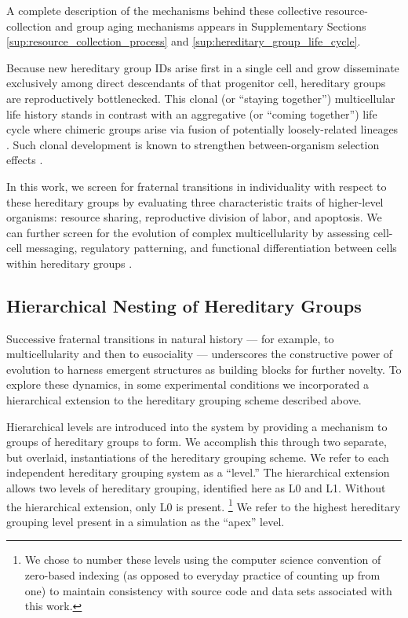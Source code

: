 A complete description of the mechanisms behind these collective resource-collection and group aging mechanisms appears in Supplementary Sections \ref{sup:resource_collection_process} and \ref{sup:hereditary_group_life_cycle}.

Because new hereditary group IDs arise first in a single cell and grow disseminate exclusively among direct descendants of that progenitor cell, hereditary groups are reproductively bottlenecked.
This clonal (or ``staying together'') multicellular life history stands in contrast with an aggregative (or ``coming together'') life cycle where chimeric groups arise via fusion of potentially loosely-related lineages \citep{staps2019emergence}.
Such clonal development is known to strengthen between-organism selection effects \citep{grosberg2007evolution}.

In this work, we screen for fraternal transitions in individuality with respect to these hereditary groups by evaluating three characteristic traits of higher-level organisms: resource sharing, reproductive division of labor, and apoptosis.
We can further screen for the evolution of complex multicellularity by assessing cell-cell messaging, regulatory patterning, and functional differentiation between cells within hereditary groups \cite{knoll2011multiple}.

\subsection{Hierarchical Nesting of Hereditary Groups} \label{sec:hierarchical_nesting}

Successive fraternal transitions in natural history --- for example, to multicellularity and then to eusociality \citep{smith1997major} --- underscores the constructive power of evolution to harness emergent structures as building blocks for further novelty.
To explore these dynamics, in some experimental conditions we incorporated a hierarchical extension to the hereditary grouping scheme described above.

Hierarchical levels are introduced into the system by providing a mechanism to groups of hereditary groups to form.
We accomplish this through two separate, but overlaid, instantiations of the hereditary grouping scheme.
We refer to each independent hereditary grouping system as a ``level.''
The hierarchical extension allows two levels of hereditary grouping, identified here as L0 and L1.
Without the hierarchical extension, only L0 is present.
\footnote{
We chose to number these levels using the computer science convention of zero-based indexing (as opposed to everyday practice of counting up from one) to maintain consistency with source code and data sets associated with this work.
}
We refer to the highest hereditary grouping level present in a simulation as the ``apex'' level.

